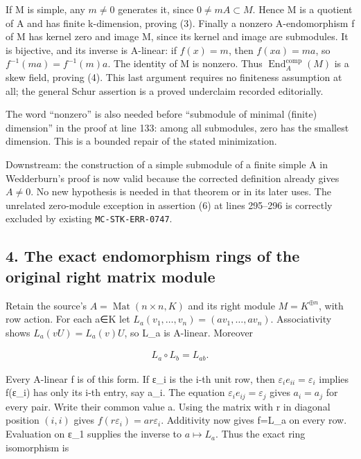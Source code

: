 If M is simple, any \(m\ne 0\) generates it, since \(0\ne mA\subset M\). Hence M is a quotient of A and has finite k-dimension, proving (3). Finally a nonzero A-endomorphism f of M has kernel zero and image M, since its kernel and image are submodules. It is bijective, and its inverse is A-linear: if \(f(x)=m\), then \(f(xa)=ma\), so \(f^{-1}(ma)=f^{-1}(m)a\). The identity of M is nonzero. Thus \(\operatorname{End}_{A}^{\mathrm{comp}}(M)\) is a skew field, proving (4). This last argument requires no finiteness assumption at all; the general Schur assertion is a proved underclaim recorded editorially.

The word ``nonzero'' is also needed before ``submodule of minimal (finite) dimension'' in the proof at line 133: among all submodules, zero has the smallest dimension. This is a bounded repair of the stated minimization.

Downstream: the construction of a simple submodule of a finite simple A in Wedderburn's proof is now valid because the corrected definition already gives \(A\ne 0\). No new hypothesis is needed in that theorem or in its later uses. The unrelated zero-module exception in assertion (6) at lines 295--296 is correctly excluded by existing \texttt{MC-STK-ERR-0747}.

\subsection{4. The exact endomorphism rings of the original right matrix module}\label{the-exact-endomorphism-rings-of-the-original-right-matrix-module}

Retain the source's \(A=\operatorname{Mat}(n\times n,K)\) and its right module \(M=K^{\oplus n}\), with row action. For each a∈K let \(L_{a}(v_{1},\ldots ,v_{n})=(av_{1},\ldots ,av_{n})\). Associativity shows \(L_{a}(vU)=L_{a}(v)U\), so L\_a is A-linear. Moreover

\[\begin{gathered}
L_{a} \circ L_{b} = L_{ab}.
\end{gathered}\]

Every A-linear f is of this form. If ε\_i is the i-th unit row, then \(\varepsilon _{i} e_{ii}=\varepsilon _{i}\) implies f(ε\_i) has only its i-th entry, say a\_i. The equation \(\varepsilon _{i} e_{ij}=\varepsilon _{j}\) gives \(a_{i}=a_{j}\) for every pair. Write their common value a. Using the matrix with r in diagonal position \((i,i)\) gives \(f(r \varepsilon _{i})=ar \varepsilon _{i}\). Additivity now gives f=L\_a on every row. Evaluation on ε\_1 supplies the inverse to \(a\mapsto L_{a}\). Thus the exact ring isomorphism is

